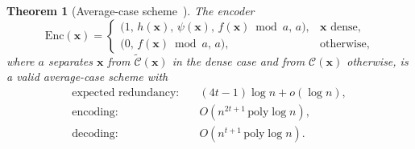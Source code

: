 \documentclass[journal,10pt]{IEEEtran}
\newtheorem{theorem}{Theorem}
\newcommand{\Enc}{\mathrm{Enc}}
\newcommand{\C}{\mathcal{C}}
\newcommand{\Ct}{\widetilde{\mathcal{C}}}
\newcommand{\bx}{\mathbf{x}}
\begin{document}
\begin{theorem}[Average-case scheme~\cite{narayanan}]\label{thm:2}
The encoder
\[
\Enc(\bx)=
\begin{cases}
\bigl(1,\,h(\bx),\,\psi(\bx),\,f(\bx)\bmod a,\,a\bigr), & \bx\text{ dense},\\[2pt]
\bigl(0,\,f(\bx)\bmod a,\,a\bigr), & \text{otherwise},
\end{cases}
\]
where $a$ separates $\bx$ from $\Ct(\bx)$ in the dense case and from $\C(\bx)$ otherwise, is a valid average-case scheme with
\begin{align*}
\text{expected redundancy:}\quad & (4t-1)\log n+o(\log n),\\
\text{encoding:}\quad & O(n^{2t+1}\,\mathrm{poly}\log n),\\
\text{decoding:}\quad & O(n^{t+1}\,\mathrm{poly}\log n).
\end{align*}
\end{theorem}
\end{document}
